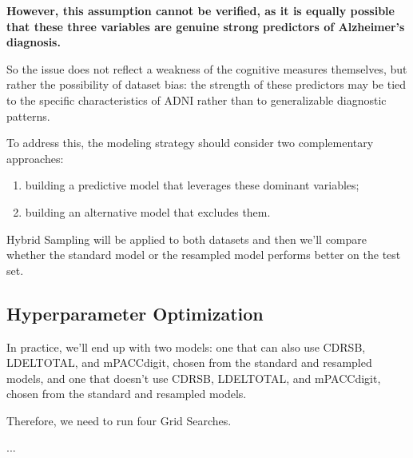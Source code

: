 \textbf{However, this assumption cannot be verified, as it is equally possible that these three variables are genuine strong predictors of Alzheimer’s diagnosis.}

So the issue does not reflect a weakness of the cognitive measures themselves, but rather the possibility of dataset bias: the strength of these predictors may be tied to the specific characteristics of ADNI rather than to generalizable diagnostic patterns. 

To address this, the modeling strategy should consider two complementary approaches:
\begin{enumerate}
	\item building a predictive model that leverages these dominant variables;
	\item building an alternative model that excludes them.
\end{enumerate}

Hybrid Sampling will be applied to both datasets and then we'll compare whether the standard model or the resampled model performs better on the test set. 

\subsection{Hyperparameter Optimization}
In practice, we'll end up with two models: one that can also use CDRSB, LDELTOTAL, and mPACCdigit, chosen from the standard and resampled models, and one that doesn't use CDRSB, LDELTOTAL, and mPACCdigit, chosen from the standard and resampled models.

Therefore, we need to run four Grid Searches.

...